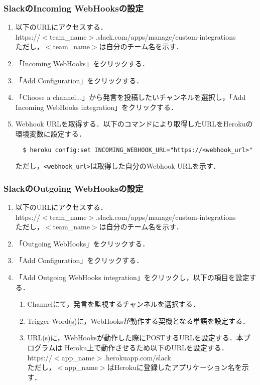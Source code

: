 \documentclass[12pt]{jsarticle}
\begin{document}
\subsubsection{SlackのIncoming WebHooksの設定}
\begin{enumerate}
\item 以下のURLにアクセスする．\\
  https://$<$team\_name$>$.slack.com/apps/manage/custom-integrations\\
  ただし，$<$team\_name$>$は自分のチーム名を示す．
\item 「Incoming WebHooks」をクリックする．
\item 「Add Configuration」をクリックする．
\item 「Choose a channel...」から発言を投稿したいチャンネルを選択し，「Add Incoming WebHooks integration」をクリックする．
\item Webhook URLを取得する．以下のコマンドにより取得したURLをHerokuの環境変数に設定する．
\begin{verbatim}
  $ heroku config:set INCOMING_WEBHOOK_URL="https://<webhook_url>"
\end{verbatim}
ただし，\verb|<webhook_url>|は取得した自分のWebhook URLを示す．
\end{enumerate}

\subsubsection{SlackのOutgoing WebHooksの設定}
\begin{enumerate}
\item 以下のURLにアクセスする．\\
 https://$<$team\_name$>$.slack.com/apps/manage/custom-integrations\\
  ただし，$<$team\_name$>$は自分のチーム名を示す．
\item 「Outgoing WebHooks」をクリックする．
\item 「Add Configuration」をクリックする．
\item 「Add Outgoing WebHooks integration」をクリックし，以下の項目を設定する．

\begin{enumerate}
  \item Channelにて，発言を監視するチャンネルを選択する．
  \item Trigger Word(s)に，WebHooksが動作する契機となる単語を設定する．
  \item URL(s)に，WebHooksが動作した際にPOSTするURLを設定する．本プログラムは
  Heroku上で動作させるため以下のURLを設定する．\\
  https://$<$app\_name$>$.herokuapp.com/slack \\
  ただし，$<$app\_name$>$はHerokuに登録したアプリケーション名を示す．
\end{enumerate}
\end{enumerate}
\end{document}
